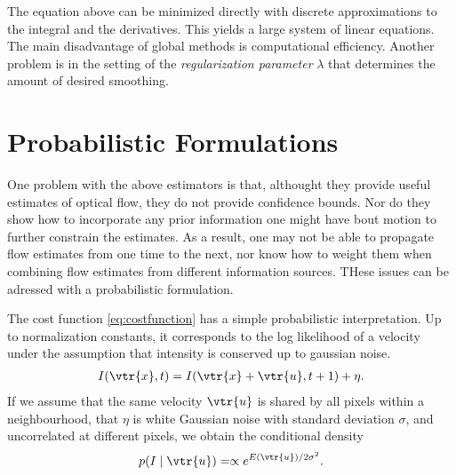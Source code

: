\begin{compactdesc}
The equation above can be minimized directly with discrete approximations to the integral and the derivatives. This yields a large system of linear equations. The main disadvantage of global methods is computational efficiency. Another problem is in the setting of the \emph{regularization parameter} $\lambda$ that determines the amount of desired smoothing.
\section{Probabilistic Formulations}
One problem with the above estimators is that, althought they provide useful estimates of optical flow, they do not provide confidence bounds. Nor do they show how to incorporate any prior information one might have bout motion to further constrain the estimates. As a result, one may not be able to propagate flow estimates from one time to the next, nor know how to weight them when combining flow estimates from different information sources. THese issues can be adressed with a probabilistic formulation.

The cost function \ref{eq:costfunction} has a simple probabilistic interpretation. Up to normalization constants, it corresponds to the log likelihood of a velocity under the assumption that intensity is conserved up to gaussian noise. 
\begin{gather*}
	I(\vtr{x},t)=I(\vtr{x}+\vtr{u},t+1)+\eta.
\end{gather*}
If we assume that the same velocity $\vtr{u}$ is shared by all pixels within a neighbourhood, that $\eta$ is white Gaussian noise with standard deviation $\sigma$, and uncorrelated at different pixels, we obtain the conditional density
\begin{gather*}
	p(I\mid \vtr{u})=\propto e^{E(\vtr{u})/2\sigma^2}.
\end{gather*}
\end{compactdesc}
